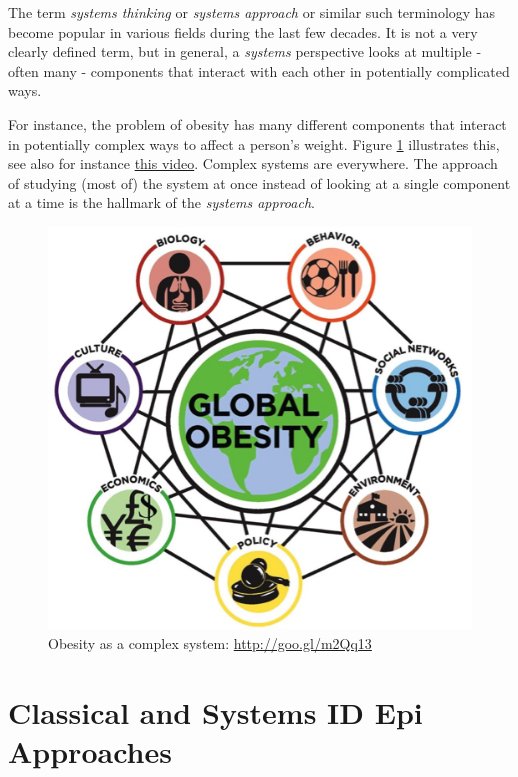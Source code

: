 \documentclass[]{book}
\theoremstyle{definition}
\theoremstyle{definition}
\theoremstyle{definition}
\theoremstyle{remark}
\begin{document}
The term \emph{systems thinking} or \emph{systems approach} or similar
such terminology has become popular in various fields during the last
few decades. It is not a very clearly defined term, but in general, a
\emph{systems} perspective looks at multiple - often many - components
that interact with each other in potentially complicated ways.

For instance, the problem of obesity has many different components that
interact in potentially complex ways to affect a person's weight. Figure
\ref{fig:obesitysystem} illustrates this, see also for instance
\href{https://youtu.be/2vojPksdbtI}{this video}. Complex systems are
everywhere. The approach of studying (most of) the system at once
instead of looking at a single component at a time is the hallmark of
the \emph{systems approach}.

\begin{figure}
\centering
\includegraphics{./images/complexsystem.png}
\caption{\label{fig:obesitysystem}Obesity as a complex system:
\url{http://goo.gl/m2Qq13}}
\end{figure}

\section{Classical and Systems ID Epi
Approaches}\label{classical-and-systems-id-epi-approaches}
\end{document}
